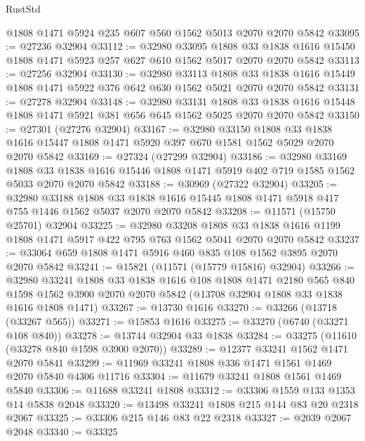 \begin{lexlean}{RustStd}
\begin{coremodule}
    @1808
    @1471
    @5924
    @235
    @607
    @560
    @1562
    @5013
    @2070
    @2070
    @5842
@33095 := @27236 @32904
@33112 := @32980
    @33095
    @1808
    @33
    @1838
    @1616
    @15450
    @1808
    @1471
    @5923
    @257
    @627
    @610
    @1562
    @5017
    @2070
    @2070
    @5842
@33113 := @27256 @32904
@33130 := @32980
    @33113
    @1808
    @33
    @1838
    @1616
    @15449
    @1808
    @1471
    @5922
    @376
    @642
    @630
    @1562
    @5021
    @2070
    @2070
    @5842
@33131 := @27278 @32904
@33148 := @32980
    @33131
    @1808
    @33
    @1838
    @1616
    @15448
    @1808
    @1471
    @5921
    @381
    @656
    @645
    @1562
    @5025
    @2070
    @2070
    @5842
@33150 := @27301 (@27276 @32904)
@33167 := @32980
    @33150
    @1808
    @33
    @1838
    @1616
    @15447
    @1808
    @1471
    @5920
    @397
    @670
    @1581
    @1562
    @5029
    @2070
    @2070
    @5842
@33169 := @27324 (@27299 @32904)
@33186 := @32980
    @33169
    @1808
    @33
    @1838
    @1616
    @15446
    @1808
    @1471
    @5919
    @402
    @719
    @1585
    @1562
    @5033
    @2070
    @2070
    @5842
@33188 := @30969 (@27322 @32904)
@33205 := @32980
    @33188
    @1808
    @33
    @1838
    @1616
    @15445
    @1808
    @1471
    @5918
    @417
    @755
    @1446
    @1562
    @5037
    @2070
    @2070
    @5842
@33208 := @11571 (@15750 @25701) @32904
@33225 := @32980
    @33208
    @1808
    @33
    @1838
    @1616
    @1199
    @1808
    @1471
    @5917
    @422
    @795
    @763
    @1562
    @5041
    @2070
    @2070
    @5842
@33237 := @33064 @659 @1808 @1471 @5916 @460 @835 @108 @1562 @3895 @2070 @2070 @5842
@33241 := @15821 (@11571 (@15779 @15816) @32904)
@33266 := @32980
    @33241
    @1808
    @33
    @1838
    @1616
    @108
    @1808
    @1471
    @2180
    @565
    @840
    @1598
    @1562
    @3900
    @2070
    @2070
    @5842
    (@13708 @32904 @1808 @33 @1838 @1616 @1808 @1471)
@33267 := @13730 @1616
@33270 := @33266 (@13718 (@33267 @565))
@33271 := @15853 @1616
@33275 := @33270 (@6740 (@33271 @108 @840))
@33278 := @13744 @32904 @33 @1838
@33284 := @33275 (@11610 (@33278 @840 @1598 @3900 @2070))
@33289 := @12377 @33241 @1562 @1471 @2070 @5841
@33299 := @11969 @33241 @1808 @336 @1471 @1561 @1469 @2070 @5840 @4306 @11716
@33304 := @11679 @33241 @1808 @1561 @1469 @5840
@33306 := @11688 @33241 @1808
@33312 := @33306 @1559 @133 @1353 @14 @5838 @2048
@33320 := @13498 @33241 @1808 @215 @144 @83 @20 @2318 @2067
@33325 := @33306 @215 @146 @83 @22 @2318
@33327 := @2039 @2067 @2048
@33340 := @33325

\end{coremodule}
\end{lexlean}
